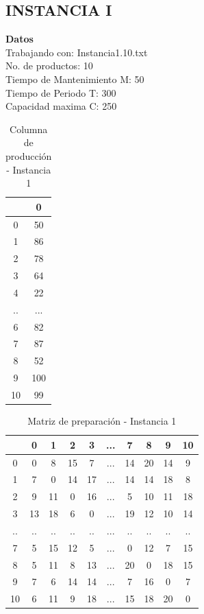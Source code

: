 \documentclass[twocolumn,10pt]{article}
\begin{document}
\subsection{INSTANCIA I}
\textbf{Datos}\\
Trabajando con:  Instancia1.10.txt\\
No. de productos: 10\\
Tiempo de Mantenimiento M: 50\\
Tiempo de Periodo T: 300\\
Capacidad maxima C: 250

\begin{table}[h!]
\centering
\begin{tabular}{||c c||} 
 \hline
  &0 \\
\hline
   
0    &50\\
1   & 86\\
2   & 78\\
3   & 64\\
4  &  22\\
..  &...\\
6  &  82\\
7  &  87\\
8  &  52\\
9   &100\\
10  & 99\\
\hline

\end{tabular}
\caption{Columna de producción - Instancia 1}
\label{table:1}
\end{table}



\begin{table}[!h]
\centering
\begin{tabular}{||c c c c c c c c c c||} 
 \hline
  &0 &  1 &  2 &  3  & ... & 7  & 8 &  9  & 10\\
\hline
    
0 	&   0	&  8 	& 15  	& 7 	& ... 	& 14 	& 20  	&14  	& 9\\
1  	&  7  	& 0 	& 14	&  17 	& ... 	& 14 	& 14 	& 18  	& 8\\
2 	&   9 	& 11 	&  0  	&16 	& ...  	& 5 	& 10  	&11  	&18\\
3  	& 13 	& 18 	&  6  	& 0 	& ... 	& 19 	& 12	& 10	&  14\\
.. 	& .. 	& .. 	& .. 	& ..  	&...  	&..  	&..  	&.. 		& ..\\
7   	& 5 	& 15	&  12	&  5 	& ... 	&  0 	&12 	&  7  	&15\\
8 	&  5 	& 11  	& 8 	& 13 	& ... 	& 20 	&  0	&  18 	& 15\\
9  	&  7 	&  6 	& 14 	& 14 	& ... 	&  7 	& 16 	&  0  	& 7\\
10  & 6		&  11 	&  9 	& 18 	& ... 	& 15	&  18	&  20 	& 0\\
\hline

\end{tabular}
\caption{Matriz de preparación - Instancia 1}
\label{table:1}
\end{table}
\end{document}
